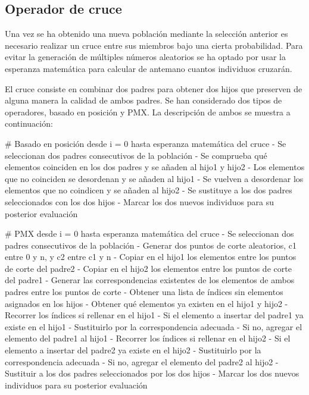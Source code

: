 \documentclass[twoside]{article}
\begin{document}
\subsection{Operador de cruce}

Una vez se ha obtenido una nueva población mediante la selección anterior es necesario
realizar un cruce entre sus miembros bajo una cierta probabilidad. Para evitar
la generación de múltiples números aleatorios se ha optado por usar la esperanza
matemática para calcular de antemano cuantos individuos cruzarán.

El cruce consiste en combinar dos padres para obtener dos hijos que preserven
de alguna manera la calidad de ambos padres. Se han considerado dos tipos de
operadores, basado en posición y PMX. La descripción de ambos se muestra a continuación:

\begin{pythoncode}
# Basado en posición
desde i = 0 hasta esperanza matemática del cruce
    - Se seleccionan dos padres consecutivos de la población
    - Se comprueba qué elementos coinciden en los dos padres y se añaden al hijo1 y hijo2
    - Los elementos que no coinciden se desordenan y se añaden al hijo1
    - Se vuelven a desordenar los elementos que no coindicen y se añaden al hijo2
    - Se sustituye a los dos padres seleccionados con los dos hijos
    - Marcar los dos nuevos individuos para su posterior evaluación
\end{pythoncode}

\begin{pythoncode}
# PMX
desde i = 0 hasta esperanza matemática del cruce
    - Se seleccionan dos padres consecutivos de la población
    - Generar dos puntos de corte aleatorios, c1 entre 0 y n, y c2 entre c1 y n
    - Copiar en el hijo1 los elementos entre los puntos de corte del padre2
    - Copiar en el hijo2 los elementos entre los puntos de corte del padre1
    - Generar las correspondencias existentes de los elementos de ambos padres
      entre los puntos de corte
    - Obtener una lista de índices sin elementos asignados en los hijos
    - Obtener qué elementos ya existen en el hijo1 y hijo2
    - Recorrer los índices si rellenar en el hijo1
        - Si el elemento a insertar del padre1 ya existe en el hijo1
            - Sustituirlo por la correspondencia adecuada
        - Si no, agregar el elemento del padre1 al hijo1
    - Recorrer los índices si rellenar en el hijo2
        - Si el elemento a insertar del padre2 ya existe en el hijo2
            - Sustituirlo por la correspondencia adecuada
        - Si no, agregar el elemento del padre2 al hijo2
    - Sustituir a los dos padres seleccionados por los dos hijos
    - Marcar los dos nuevos individuos para su posterior evaluación
\end{pythoncode}
\end{document}
